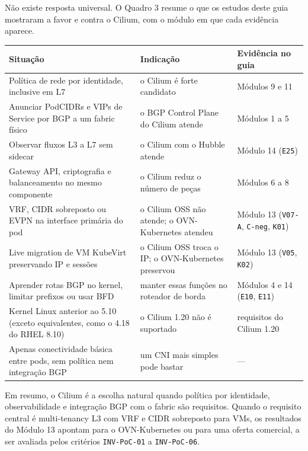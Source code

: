 \documentclass[12pt,openany,oneside,a4paper,chapter=TITLE,english,brazil]{abntex2}
\begin{document}
Não existe resposta universal. O Quadro 3 resume o que os estudos deste guia
mostraram a favor e contra o Cilium, com o módulo em que cada evidência
aparece.

\begin{quadro}[!htbp]
\caption{Situações a favor e contra o Cilium, segundo os estudos do guia}
\footnotesize
\begin{tabularx}{\textwidth}{|>{\raggedright\arraybackslash\hsize=1.259\hsize}X|>{\raggedright\arraybackslash\hsize=1.024\hsize}X|>{\raggedright\arraybackslash\hsize=0.717\hsize}X|}
\hline
\textbf{Situação} & \textbf{Indicação} & \textbf{Evidência no guia} \\
\hline
Política de rede por identidade, inclusive em L7 & o Cilium é forte candidato & Módulos 9 e 11 \\
\hline
Anunciar PodCIDRs e VIPs de Service por BGP a um fabric físico & o BGP Control Plane do Cilium atende & Módulos 1 a 5 \\
\hline
Observar fluxos L3 a L7 sem sidecar & o Cilium com o Hubble atende & Módulo 14 (\texttt{E25}) \\
\hline
Gateway API, criptografia e balanceamento no mesmo componente & o Cilium reduz o número de peças & Módulos 6 a 8 \\
\hline
VRF, CIDR sobreposto ou EVPN na interface primária do pod & o Cilium OSS não atende; o OVN-Kubernetes atendeu & Módulo 13 (\texttt{V07-{}\allowbreak{}A}, \texttt{C-{}\allowbreak{}neg},
\texttt{K01}) \\
\hline
Live migration de VM KubeVirt preservando IP e sessões & o Cilium OSS troca o IP; o OVN-Kubernetes preservou & Módulo 13 (\texttt{V05}, \texttt{K02}) \\
\hline
Aprender rotas BGP no kernel, limitar prefixos ou usar BFD & manter essas funções no roteador de borda & Módulos 4 e 14 (\texttt{E10}, \texttt{E11}) \\
\hline
Kernel Linux anterior ao 5.10 (exceto equivalentes, como o 4.18 do RHEL
8.10) & o Cilium 1.20 não é suportado & requisitos do Cilium 1.20 \\
\hline
Apenas conectividade básica entre pods, sem política nem integração BGP & um CNI mais simples pode bastar & --- \\
\hline
\end{tabularx}
\end{quadro}

Em resumo, o Cilium é a escolha natural quando política por identidade,
observabilidade e integração BGP com o fabric são requisitos. Quando o
requisito central é multi-tenancy L3 com VRF e CIDR sobreposto para VMs, os
resultados do Módulo 13 apontam para o OVN-Kubernetes ou para uma oferta
comercial, a ser avaliada pelos critérios \texttt{INV-{}\allowbreak{}Po\allowbreak{}C-{}\allowbreak{}01} a \texttt{INV-{}\allowbreak{}Po\allowbreak{}C-{}\allowbreak{}06}.
\end{document}
